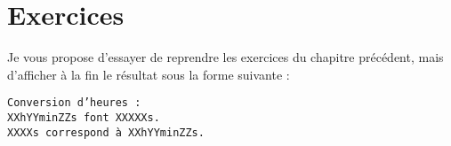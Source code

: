\section*{Exercices}
{}
Je vous propose d'essayer de reprendre les exercices du chapitre précédent, mais d'afficher à la fin le résultat sous la forme suivante :
\begin{verbatim}
Conversion d’heures :
XXhYYminZZs font XXXXXs.
XXXXs correspond à XXhYYminZZs.
\end{verbatim}
